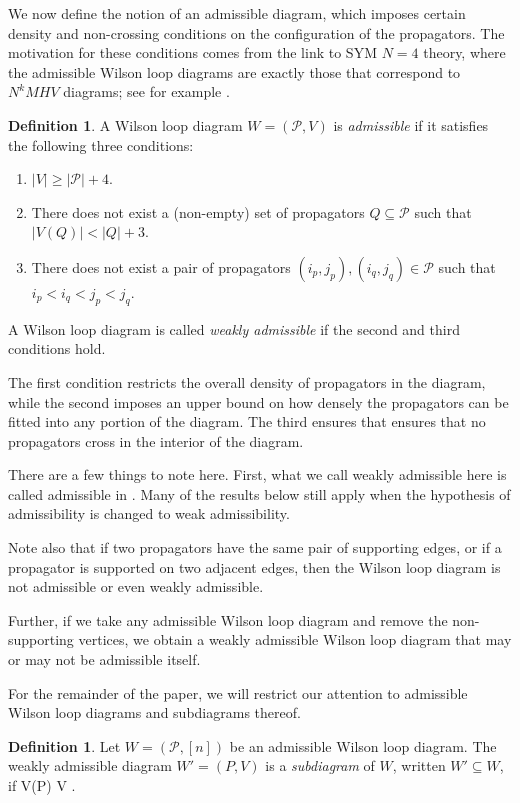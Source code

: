 \documentclass[11pt]{article}
\def\bas #1\eas{\begin{align*} #1 \end{align*}}
\newcommand{\cP}{\mathcal{P}}
\theoremstyle{remark}
\theoremstyle{definition}
\newtheorem{dfn}[thm]{Definition}
\begin{document}
We now define the notion of an admissible diagram, which imposes certain density and non-crossing conditions on the configuration of the propagators. The motivation for these conditions comes from the link to SYM $N=4$ theory, where the admissible Wilson loop diagrams are exactly those that correspond to $N^kMHV$ diagrams; see for example \cite{Amplituhedronsquared}.

\begin{dfn}\label{admisdfn}
A Wilson loop diagram $W = (\cP,V)$ is {\em admissible} if it satisfies the following three conditions: \begin{enumerate}
\item $|V| \geq |\cP| + 4.$
\item There does not exist a (non-empty) set of propagators $Q \subseteq \cP$ such that $|V(Q)| < |Q| + 3$.
\item There does not exist a pair of propagators $(i_p,j_p),(i_q,j_q) \in \cP$ such that $i_p < i_q < j_p <j_q$.
\end{enumerate}
A Wilson loop diagram is called {\em weakly admissible} if the second and third conditions hold.
 \end{dfn}

The first condition restricts the overall density of propagators in the diagram, while the second imposes an upper bound on how densely the propagators can be fitted into any portion of the diagram. The third ensures that ensures that no propagators cross in the interior of the diagram. 

There are a few things to note here.  First, what we call weakly admissible here is called admissible in \cite{wilsonloop}.  Many of the results below still apply when the hypothesis of admissibility is changed to weak admissibility.

Note also that if two propagators have the same pair of supporting edges, or if a propagator is supported on two adjacent edges, then the Wilson loop diagram is not admissible or even weakly admissible.

Further, if we take any admissible Wilson loop diagram and remove the non-supporting vertices, we obtain a weakly admissible Wilson loop diagram that may or may not be admissible itself.

For the remainder of the paper, we will restrict our attention to admissible Wilson loop diagrams and subdiagrams thereof.

\begin{dfn} \label{subdiagramdfn}
Let $W = (\cP, [n])$ be an admissible Wilson loop diagram. The weakly admissible diagram $W' = (P,V)$ is a {\em subdiagram} of $W$, written $W' \subseteq W$, if \bas P \subseteq \cP {} \quad V(P) \subseteq V \subseteq [n]\;.\eas
\end{dfn}
\end{document}
